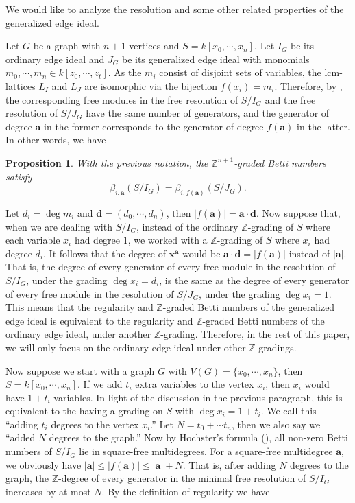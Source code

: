 \documentclass[dvipsnames,10pt]{article}
\newtheorem{proposition}[theorem]{Proposition}
\begin{document}
We would like to analyze the resolution and some other related properties of the generalized edge ideal. 

Let $G$ be a graph with $n+1$ vertices and $S=k[x_0,\cdots,x_n]$. Let $I_G$ be its ordinary edge ideal and $J_G$ be its generalized edge ideal with monomials $m_0,\cdots,m_n\in k[z_0,\cdots,z_t]$. As the $m_i$ consist of disjoint sets of variables, the lcm-lattices $L_I$ and $L_J$ are isomorphic via the bijection $f(x_i)=m_i$. Therefore, by , the corresponding free modules in the free resolution of $S/I_G$ and the free resolution of $S/J_G$ have the same number of generators, and the generator of degree $\mathbf{a}$ in the former corresponds to the generator of degree $f(\mathbf{a})$ in the latter. In other words, we have

\begin{proposition}
    With the previous notation, the $\mathbb{Z}^{n+1}$-graded Betti numbers satisfy
    \begin{equation*}
        \beta_{i,\mathbf{a}}(S/I_G) = \beta_{i,f(\mathbf{a})}(S/J_G).
    \end{equation*}
\end{proposition}

Let $d_i=\deg m_i$ and $\mathbf{d}=(d_0,\cdots,d_n)$, then $|f(\mathbf{a})|=\mathbf{a}\cdot \mathbf{d}$. Now suppose that, when we are dealing with $S/I_G$, instead of the ordinary $\mathbb{Z}$-grading of $S$ where each variable $x_i$ had degree $1$, we worked with a $\mathbb{Z}$-grading of $S$ where $x_i$ had degree $d_i$. It follows that the degree of $\mathbf{x}^\mathbf{a}$ would be $\mathbf{a}\cdot \mathbf{d}=|f(\mathbf{a})|$ instead of $|\mathbf{a}|$. That is, the degree of every generator of every free module in the resolution of $S/I_G$, under the grading $\deg x_i=d_i$, is the same as the degree of every generator of every free module in the resolution of $S/J_G$, under the grading $\deg x_i=1$. This means that the regularity and $\mathbb{Z}$-graded Betti numbers of the generalized edge ideal is equivalent to the regularity and $\mathbb{Z}$-graded Betti numbers of the ordinary edge ideal, under another $\mathbb{Z}$-grading. Therefore, in the rest of this paper, we will only focus on the ordinary edge ideal under other $\mathbb{Z}$-gradings.

Now suppose we start with a graph $G$ with $V(G)=\{x_0,\cdots,x_n\}$, then $S=k[x_0,\cdots,x_n]$. If we add $t_i$ extra variables to the vertex $x_i$, then $x_i$ would have $1+t_i$ variables. In light of the discussion in the previous paragraph, this is equivalent to the having a grading on $S$ with $\deg x_i=1+t_i$. We call this ``adding $t_i$ degrees to the vertex $x_i$.'' Let $N=t_0+\cdots t_n$, then we also say we ``added $N$ degrees to the graph.'' Now by Hochster's formula (), all non-zero Betti numbers of $S/I_G$ lie in square-free multidegrees. For a square-free multidegree $\mathbf{a}$, we obviously have $|\mathbf{a}|\leqslant|f(\mathbf{a})| \leqslant |\mathbf{a}| + N$. That is, after adding $N$ degrees to the graph, the $\mathbb{Z}$-degree of every generator in the minimal free resolution of $S/I_G$ increases by at most $N$. By the definition of regularity we have
\end{document}
